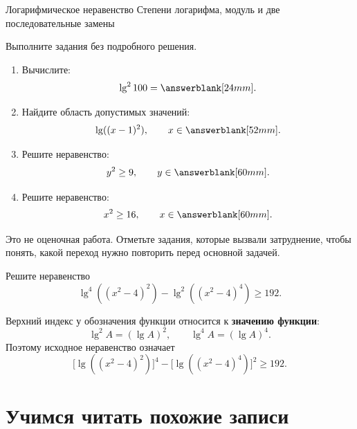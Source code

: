 \worksheettitle
  {Логарифмическое неравенство}
  {Степени логарифма, модуль и две последовательные замены}
\studentnameblock

\begin{checkpointbox}
  Выполните задания без подробного решения.
  \begin{enumerate}[label=\textbf{\arabic*.},itemsep=0.35em]
    \item Вычислите:
      \[
        \lg^2 100=\answerblank[24mm].
      \]
    \item Найдите область допустимых значений:
      \[
        \lg((x-1)^2),\qquad x\in\answerblank[52mm].
      \]
    \item Решите неравенство:
      \[
        y^2\ge9,\qquad y\in\answerblank[60mm].
      \]
    \item Решите неравенство:
      \[
        x^2\ge16,\qquad x\in\answerblank[60mm].
      \]
  \end{enumerate}
\end{checkpointbox}

\begin{notebox}
  Это не оценочная работа. Отметьте задания, которые вызвали затруднение,
  чтобы понять, какой переход нужно повторить перед основной задачей.
\end{notebox}

\begin{problembox}
  Решите неравенство
  \[
    \lg^4((x^2-4)^2)-\lg^2((x^2-4)^4)\ge192.
  \]
\end{problembox}

\begin{notebox}
  Верхний индекс у обозначения функции относится к \textbf{значению функции}:
  \[
    \lg^2 A=(\lg A)^2,
    \qquad
    \lg^4 A=(\lg A)^4.
  \]
  Поэтому исходное неравенство означает
  \[
    \bigl[\lg((x^2-4)^2)\bigr]^4
    -\bigl[\lg((x^2-4)^4)\bigr]^2\ge192.
  \]
\end{notebox}

\section{Учимся читать похожие записи}

